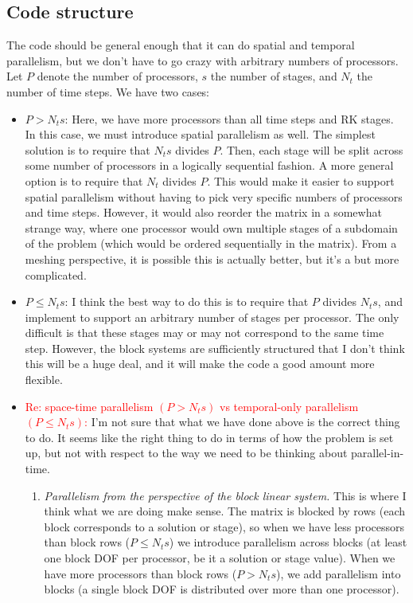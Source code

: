 \documentclass[a4paper,10pt]{article}
\begin{document}
\subsection{Code structure}

The code should be general enough that it can do spatial and temporal parallelism, but we don't have to go crazy with
arbitrary numbers of processors. Let $P$ denote the number of processors, $s$ the number of stages, and 
$N_t$ the number of time steps. We have two cases:
%
\begin{itemize}
\item $P > N_ts$: Here, we have more processors than all time steps and RK stages. In this case, we must introduce
spatial parallelism as well. The simplest solution is to require that $N_ts$ divides $P$. Then, each stage will be split
across some number of processors in a logically sequential fashion. A more general option is to require that $N_t$
divides $P$. This would make it easier to support spatial parallelism without having to pick very specific numbers of
processors and time steps. However, it would also reorder the matrix in a somewhat strange way, where one processor
would own multiple stages of a subdomain of the problem (which would be ordered sequentially in the matrix). From a
meshing perspective, it is possible this is actually better, but it's a but more complicated.

\item $P \leq N_ts$: I think the best way to do this is to require that $P$ divides $N_ts$, and implement to support
an arbitrary number of stages per processor. The only difficult is that these stages may or may not correspond to
the same time step. However, the block systems are sufficiently structured that I don't think this will be a huge deal,
and it will make the code a good amount more flexible. 

\item \textcolor{red}{Re: space-time parallelism $(P > N_t s)$ vs temporal-only parallelism $(P \leq N_t s)$:} I'm not sure that what we have done above is the correct thing to do. It seems like the right thing to do in terms of how the problem is set up, but not with respect to the way we need to be thinking about parallel-in-time. 
\begin{enumerate}
\item \textit{Parallelism from the perspective of the block linear system.} This is where I think what we are doing make sense. The matrix is blocked by rows (each block corresponds to a solution or stage), so when we have less processors than block rows ($P \leq N_t s $) we introduce parallelism across blocks (at least one block DOF per processor, be it a solution or stage value). When we have more processors than block rows ($P > N_t s$), we add parallelism into blocks (a single block DOF is distributed over more than one processor).


\end{enumerate}
\end{itemize}
\end{document}
